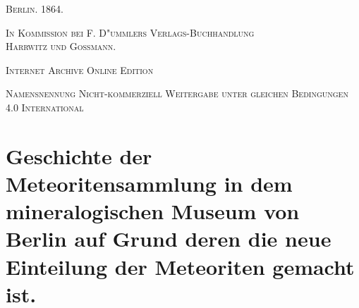 \documentclass[a4paper, 11pt, oneside]{article}
\begin{document}
\begin{titlepage}
	\vspace{1\baselineskip}

	{\small\scshape Berlin. 1864.}
	
	{\small\scshape{In Kommission bei F. D"ummlers Verlags-Buchhandlung\\Harrwitz und Gossmann.}}
	
	\vspace{0.5\baselineskip} %

    \scshape Internet Archive Online Edition  %
	
	{\scshape\small Namensnennung Nicht-kommerziell Weitergabe unter gleichen Bedingungen 4.0 International} %
\end{titlepage}
\setlength{\parskip}{1mm plus1mm minus1mm}
\clearpage
\tableofcontents
\clearpage
\section*{Geschichte der Meteoritensammlung in dem mineralogischen Museum von Berlin auf Grund deren die neue Einteilung der Meteoriten gemacht ist.}
\end{document}
